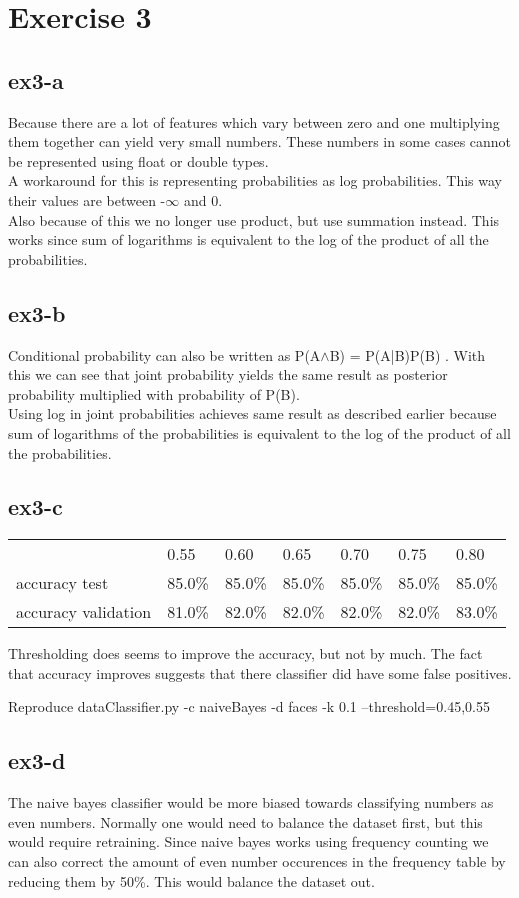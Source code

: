 \section{Exercise 3}
\subsection{ex3-a}
Because there are a lot of features which vary between zero and one multiplying them together can yield very small
numbers. These numbers in some cases cannot be represented using float or double types.\\
A workaround for this is representing probabilities as log probabilities. This way their values are between -$\infty$ and 0.\\
Also because of this we no longer use product, but use summation instead. This works since sum of logarithms is
equivalent to the log of the product of all the probabilities.

\subsection{ex3-b}
Conditional probability can also be written as P(A$\wedge$B) = P(A|B)P(B) . With this we can see that joint probability yields
the same result as posterior probability multiplied with probability of P(B). \\
Using log in joint probabilities achieves same result as described earlier because sum of logarithms of the
probabilities is equivalent to the log of the product of all the probabilities.

\subsection{ex3-c}
\begin{table}[!htbp]
\centering
\begin{tabular}{l|llllll}
                    & 0.55   & 0.60   & 0.65   & 0.70   & 0.75   & 0.80   \\ \cline{2-7}
accuracy test       & 85.0\% & 85.0\% & 85.0\% & 85.0\% & 85.0\% & 85.0\% \\ \cline{2-7}
accuracy validation & 81.0\% & 82.0\% & 82.0\% & 82.0\% & 82.0\% & 83.0\%
\end{tabular}
\end{table}
Thresholding does seems to improve the accuracy, but not by much. The fact that accuracy improves suggests that there
 classifier did have some false positives.

Reproduce dataClassifier.py -c naiveBayes -d faces -k 0.1 --threshold=0.45,0.55

\subsection{ex3-d}
The naive bayes classifier would be more biased towards classifying numbers as even numbers. Normally one would need to
balance the dataset first, but this would require retraining. Since naive bayes works using frequency counting we can
also correct the amount of even number occurences in the frequency table by reducing them by 50\%. This would balance the
dataset out.